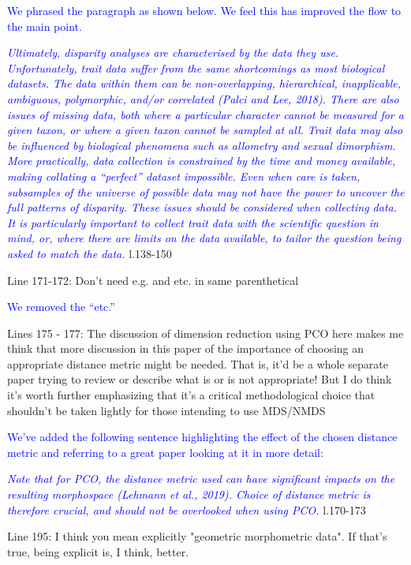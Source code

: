 \documentclass[12pt,letterpaper]{article}
\begin{document}
\textcolor{blue}{We phrased the paragraph as shown below. We feel this has improved the flow to the main point.}

\textcolor{blue}{\textit{Ultimately, disparity analyses are characterised by the data they use. Unfortunately, trait data suffer from the same shortcomings as most biological datasets. The data within them can be non-overlapping, hierarchical, inapplicable, ambiguous, polymorphic, and/or correlated  (Palci and Lee, 2018). There are also issues of missing data, both where a particular character cannot be measured for a given taxon, or where a given taxon cannot be sampled at all. Trait data may also be influenced by biological phenomena such as allometry and sexual dimorphism. More practically, data collection is constrained by the time and money available, making collating a ``perfect'' dataset impossible. Even when care is taken, subsamples of the universe of possible data may not have the power to uncover the full patterns of disparity. These issues should be considered when collecting data. It is particularly important to collect trait data with the scientific question in mind, or, where there are limits on the data available, to tailor the question being asked to match the data.}} l.138-150 %

\noindent Line 171-172: Don't need e.g. and etc. in same parenthetical

\textcolor{blue}{We removed the  ``etc.''}

\noindent Lines 175 - 177: The discussion of dimension reduction using PCO here makes me think that more discussion in this paper of the importance of choosing an appropriate distance metric might be needed. That is, it'd be a whole separate paper trying to review or describe what is or is not appropriate! But I do think it's worth further emphasizing that it's a critical methodological choice that shouldn't be taken lightly for those intending to use MDS/NMDS

\textcolor{blue}{We've added the following sentence highlighting the effect of the chosen distance metric and referring to a great paper looking at it in more detail:}

\textcolor{blue}{\textit{Note that for PCO, the distance metric used can have significant impacts on the resulting morphospace (Lehmann et al., 2019). Choice of distance metric is therefore crucial, and should not be overlooked when using PCO.}} l.170-173 %


\noindent Line 195: I think you mean explicitly "geometric morphometric data". If that's true, being explicit is, I think, better.
\end{document}
